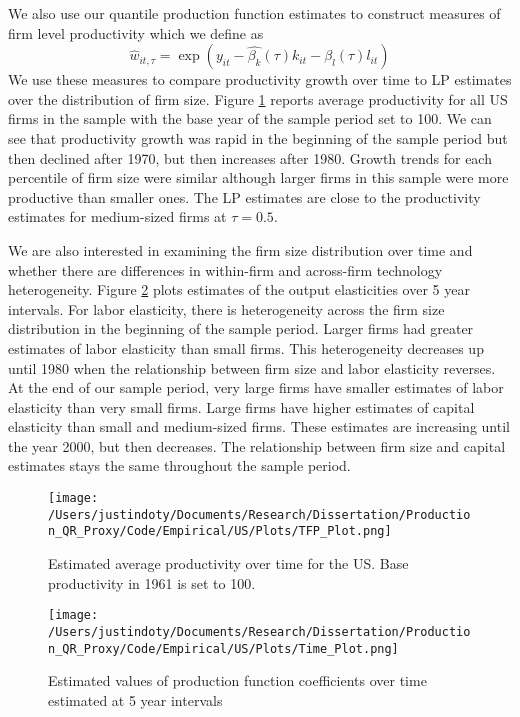 \documentclass[11pt]{article}
\begin{document}
We also use our quantile production function estimates to construct measures of firm level productivity which we define as
\begin{equation}
\hat{w}_{it,\tau}=\exp(y_{it}-\hat{\beta_{k}}(\tau)k_{it}-\hat{\beta_{l}}(\tau)l_{it})
\end{equation}
We use these measures to compare productivity growth over time to LP estimates over the distribution of firm size. Figure \ref{fig:USpgrowth} reports average productivity for all US firms in the sample with the base year of the sample period set to 100. We can see that productivity growth was rapid in the beginning of the sample period but then declined after 1970, but then increases after 1980. Growth trends for each percentile of firm size were similar although larger firms in this sample were more productive than smaller ones. The LP estimates are close to the productivity estimates for medium-sized firms at $\tau=0.5$.

We are also interested in examining the firm size distribution over time and whether there are differences in within-firm and across-firm technology heterogeneity. Figure \ref{fig:UStimecoef} plots estimates of the output elasticities over 5 year intervals. For labor elasticity, there is heterogeneity across the firm size distribution in the beginning of the sample period. Larger firms had greater estimates of labor elasticity than small firms. This heterogeneity decreases up until 1980 when the relationship between firm size and labor elasticity reverses. At the end of our sample period, very large firms have smaller estimates of labor elasticity than very small firms. Large firms have higher estimates of capital elasticity than small and medium-sized firms. These estimates are increasing until the year 2000, but then decreases. The relationship between firm size and capital estimates stays the same throughout the sample period.


\begin{figure}[H]
\centering
\texttt{[image: /Users/justindoty/Documents/Research/Dissertation/Production\_QR\_Proxy/Code/Empirical/US/Plots/TFP\_Plot.png]}
\caption{Estimated average productivity over time for the US. Base productivity in 1961 is set to 100.}
\label{fig:USpgrowth}
\end{figure}

\begin{figure}[H]
\centering
\texttt{[image: /Users/justindoty/Documents/Research/Dissertation/Production\_QR\_Proxy/Code/Empirical/US/Plots/Time\_Plot.png]}
\caption{Estimated values of production function coefficients over time estimated at 5 year intervals}
\label{fig:UStimecoef}
\end{figure}
\end{document}
